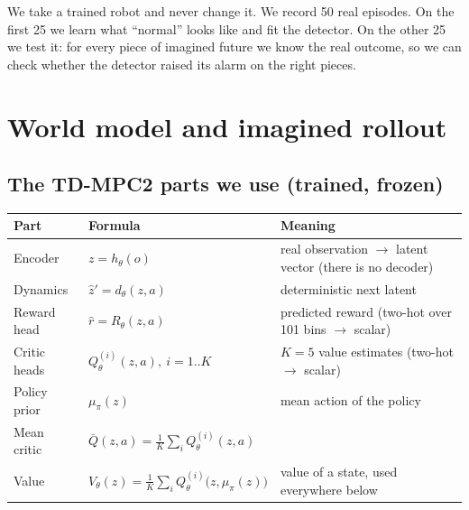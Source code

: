 \documentclass[11pt]{article}
\newcommand{\Qbar}{\bar Q}
\begin{document}
\begin{inwords}
We take a trained robot and never change it. We record 50 real episodes. On the first 25 we learn what ``normal''
looks like and fit the detector. On the other 25 we test it: for every piece of imagined future we know the real
outcome, so we can check whether the detector raised its alarm on the right pieces.
\end{inwords}

\section{World model and imagined rollout}\label{sec:wm}

\subsection{The TD-MPC2 parts we use (trained, frozen)}

\begin{center}
\begin{tabular}{@{}lll@{}}
\toprule
Part & Formula & Meaning\\
\midrule
Encoder & $z=h_\theta(o)$ & real observation $\to$ latent vector (there is no decoder)\\
Dynamics & $\hat z'=d_\theta(z,a)$ & deterministic next latent\\
Reward head & $\hat r=R_\theta(z,a)$ & predicted reward (two-hot over 101 bins $\to$ scalar)\\
Critic heads & $Q^{(i)}_\theta(z,a),\ i=1..K$ & $K=5$ value estimates (two-hot $\to$ scalar)\\
Policy prior & $\mu_\pi(z)$ & mean action of the policy\\
Mean critic & $\Qbar(z,a)=\frac1K\sum_i Q^{(i)}_\theta(z,a)$ & \\
Value & $V_\theta(z)=\frac1K\sum_i Q^{(i)}_\theta\bigl(z,\mu_\pi(z)\bigr)$ & value of a state, used everywhere below\\
\bottomrule
\end{tabular}
\end{center}
\end{document}
